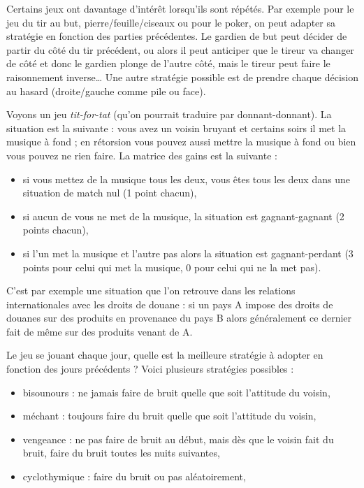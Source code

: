 \documentclass[11pt,class=report,crop=false]{standalone}
\begin{document}
Certains jeux ont davantage d'intérêt lorsqu'ils sont répétés. Par exemple pour le jeu du tir au but, \og{}pierre/feuille/ciseaux\fg{} ou pour le poker, on peut adapter sa stratégie en fonction des parties précédentes. Le gardien de but peut décider de partir du côté du tir précédent, ou alors il peut anticiper que le tireur va changer de côté et donc le gardien plonge de l'autre côté, mais le tireur peut faire le raisonnement inverse\ldots{} Une autre stratégie possible est de prendre chaque décision au hasard (droite/gauche comme pile ou face).

\medskip

Voyons un jeu \og{}\emph{tit-for-tat}\fg{} (qu'on pourrait traduire par \og{}donnant-donnant\fg{}). 
La situation est la suivante : vous avez un voisin bruyant et certains soirs il met la musique à fond ; en rétorsion vous pouvez aussi mettre la musique à fond ou bien vous pouvez  ne rien faire. La matrice des gains est la suivante :




\begin{itemize}
	\item si vous mettez de la musique tous les deux, vous êtes tous les deux dans une situation de match nul (1 point chacun),
	\item si aucun de vous ne met de la musique, la situation est gagnant-gagnant (2 points chacun),
	\item si l'un met la musique et l'autre pas alors la situation est gagnant-perdant (3 points pour celui qui met la musique, 0 pour celui qui ne la met pas).
\end{itemize}

C'est par exemple une situation que l'on retrouve dans les relations internationales avec les droits de douane : si un pays A impose des droits de douanes sur des produits en provenance du pays B alors généralement ce dernier fait de même sur des produits venant de A.


Le jeu se jouant chaque jour, quelle est la meilleure stratégie à adopter en fonction des jours précédents ?
Voici plusieurs stratégies possibles :
\begin{itemize}
	\item bisounours : ne jamais faire de bruit quelle que soit l'attitude du voisin,
	\item méchant : toujours faire du bruit quelle que soit l'attitude du voisin,
	\item vengeance : ne pas faire de bruit au début, mais dès que le voisin fait du bruit, faire du bruit toutes les nuits suivantes,
	\item cyclothymique : faire du bruit ou pas aléatoirement,
\end{itemize}
\end{document}
